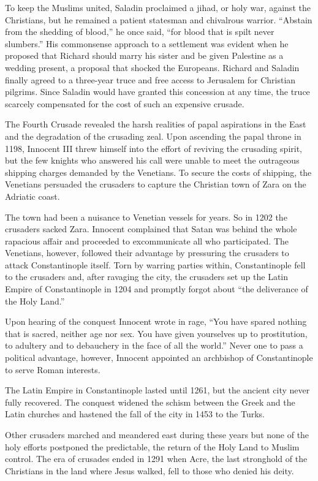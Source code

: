 To keep the Muslims united, Saladin proclaimed a jihad, or holy war, against the Christians, but he
remained a patient statesman and chivalrous warrior. “Abstain from the shedding of blood,” he once
said, “for blood that is spilt never slumbers.” His commonsense approach to a settlement was evident
when he proposed that Richard should marry his sister and be given Palestine as a wedding present, a
proposal that shocked the Europeans. Richard and Saladin finally agreed to a three-year truce and
free access to Jerusalem for Christian pilgrims. Since Saladin would have granted this concession at
any time, the truce scarcely compensated for the cost of such an expensive crusade.

The Fourth Crusade revealed the harsh realities of papal aspirations in the East and the degradation
of the crusading zeal. Upon ascending the papal throne in 1198, Innocent III threw himself into the
effort of reviving the crusading spirit, but the few knights who answered his call were unable to
meet the outrageous shipping charges demanded by the Venetians. To secure the costs of shipping, the
Venetians persuaded the crusaders to capture the Christian town of Zara on the Adriatic coast.

The town had been a nuisance to Venetian vessels for years. So in 1202 the crusaders sacked Zara.
Innocent complained that Satan was behind the whole rapacious affair and proceeded to excommunicate
all who participated. The Venetians, however, followed their advantage by pressuring the crusaders
to attack Constantinople itself. Torn by warring parties within, Constantinople fell to the
crusaders and, after ravaging the city, the crusaders set up the Latin Empire of Constantinople in
1204 and promptly forgot about “the deliverance of the Holy Land.”

Upon hearing of the conquest Innocent wrote in rage, “You have spared nothing that is sacred,
neither age nor sex. You have given yourselves up to prostitution, to adultery and to debauchery in
the face of all the world.” Never one to pass a political advantage, however, Innocent appointed an
archbishop of Constantinople to serve Roman interests.

The Latin Empire in Constantinople lasted until 1261, but the ancient city never fully recovered.
The conquest widened the schism between the Greek and the Latin churches and hastened the fall of
the city in 1453 to the Turks.

Other crusaders marched and meandered east during these years but none of the holy efforts postponed
the predictable, the return of the Holy Land to Muslim control. The era of crusades ended in 1291
when Acre, the last stronghold of the Christians in the land where Jesus walked, fell to those who
denied his deity.

